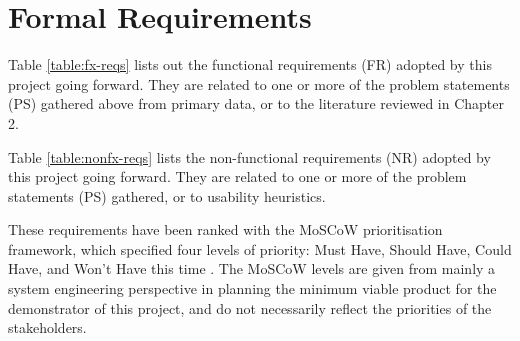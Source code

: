 \section{Formal Requirements}

Table \ref{table:fx-reqs} lists out the functional requirements (FR) adopted by this
project going forward. They are related to one or more of the problem statements (PS) gathered
above from primary data, or to the literature reviewed in Chapter 2.

Table \ref{table:nonfx-reqs} lists the non-functional requirements (NR) adopted by this
project going forward. They are related to one or more of the problem statements (PS) gathered,
or to usability heuristics.

These requirements have been ranked with the MoSCoW prioritisation
framework, which specified four levels of priority: Must Have, Should Have, Could Have, and Won’t Have
this time \citep{agile2018moscow}. The MoSCoW levels are given from mainly a system engineering perspective
in planning the minimum viable product for the demonstrator of this project,
and do not necessarily reflect the priorities of the stakeholders.

